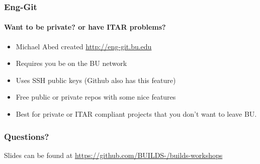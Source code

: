 \documentclass{beamer}
\begin{document}
  \begin{frame}
    \frametitle{Eng-Git}
    \framesubtitle{Want to be private? or have ITAR problems?}

    \begin{itemize}
  		\item Michael Abed created \url{http://eng-git.bu.edu}
  		\item Requires you be on the BU network
  		\item Uses SSH public keys (Github also has this feature)
  		\item Free public or private repos with some nice features
  		\item Best for private or ITAR compliant projects that you don't want 
  			  to leave BU.
    \end{itemize}
  \end{frame}

  \begin{frame}
    \frametitle{Questions?}
    Slides can be found at \url{https://github.com/BUILDS-/builds-workshops}
  \end{frame}
\end{document}
